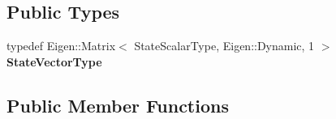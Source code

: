\subsection*{Public Types}
\begin{DoxyCompactItemize}
\item 
typedef Eigen\+::\+Matrix$<$ State\+Scalar\+Type, Eigen\+::\+Dynamic, 1 $>$ {\bfseries State\+Vector\+Type}\hypertarget{classtudat_1_1propagators_1_1CustomStatePropagatorSettings_ab46c27a359ce424dd090619f5c3efa2d}{}\label{classtudat_1_1propagators_1_1CustomStatePropagatorSettings_ab46c27a359ce424dd090619f5c3efa2d}

\end{DoxyCompactItemize}
\subsection*{Public Member Functions}
